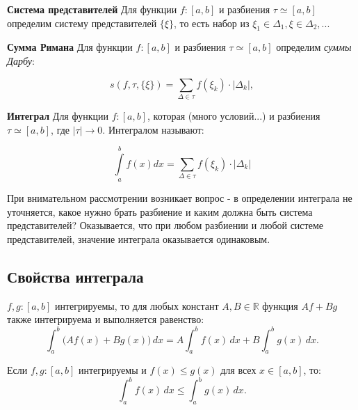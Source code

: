 \begin{definition}
\textbf{Система представителей} Для функции $f \colon [a, b] $ и разбиения $\tau \simeq [a, b]$ определим систему представителей $\{\xi\}$, то есть набор из $\xi_1 \in \Delta_1, \xi \in \Delta_2, ...$ 

\end{definition}


\begin{definition}
\textbf{Сумма Римана} Для функции $f \colon [a, b] $ и разбиения $\tau \simeq [a, b]$ определим \textit{суммы Дарбу}:

\[
s(f, \tau, \{\xi\}) = \sum_{\Delta \in \tau} f(\xi_k) \cdot |\Delta_k|,
\]

\end{definition}

\begin{definition}
\textbf{Интеграл} Для функции $f \colon [a, b] $, которая (много условий...) и разбиения $\tau \simeq [a, b]$, где $|\tau| \rightarrow 0 $. Интегралом называют:

\[
\int\limits_{a}^{b} f(x)dx = \sum_{\Delta \in \tau} f(\xi_k) \cdot |\Delta_k|
\]

При внимательном рассмотрении возникает вопрос - в определении интеграла не уточняется, какое нужно брать разбиение и каким должна быть система представителей? Оказывается, что при любом разбиении и любой системе представителей, значение интеграла оказывается одинаковым.

\end{definition}

\subsection{Свойства интеграла}

\begin{theorem}\label{thm:linearity}
$f, g \colon [a, b]$ интегрируемы, то для любых констант $A, B \in \mathbb{R}$ функция $Af + Bg$ также интегрируема и выполняется равенство:
\[
\int_a^b \big(Af(x) + Bg(x)\big) \, dx = A\int_a^b f(x) \, dx + B\int_a^b g(x) \, dx.
\]
\end{theorem}

\begin{theorem}\label{thm:monotonicity}
Если $f, g \colon [a, b]$ интегрируемы и $f(x) \leq g(x)$ для всех $x \in [a, b]$, то:
\[
\int_a^b f(x) \, dx \leq \int_a^b g(x) \, dx.
\]
\end{theorem}

